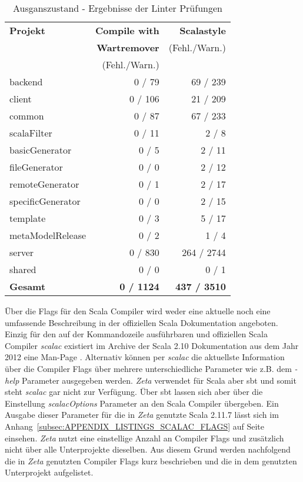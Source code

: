 \begin{table}[ht]
    \smallskip
    \centering
    \begin{tabular}{| l | r | r |}
    \hline
    \bf Projekt & \bf Compile with & \bf Scalastyle \\ 
    ~ & \bf Wartremover & (Fehl./Warn.) \\ 
    ~ & (Fehl./Warn.) & ~ \\ \hline
    backend & 0 / 79 & 69 / 239 \\ \hline
    client & 0 / 106 & 21 / 209  \\ \hline
    common & 0 / 87 & 67 / 233 \\ \hline
    scalaFilter & 0 / 11 & 2 / 8 \\ \hline
    basicGenerator & 0 / 5 & 2 / 11  \\ \hline
    fileGenerator & 0 / 0 & 2 / 12  \\ \hline
    remoteGenerator & 0 / 1 & 2 / 17 \\ \hline
    specificGenerator & 0 / 0 & 2 / 15 \\ \hline
    template & 0 / 3 & 5 / 17 \\ \hline
    metaModelRelease & 0 / 2 & 1 / 4 \\ \hline
    server & 0 / 830 & 264 / 2744 \\ \hline
    shared & 0 / 0 & 0 / 1\\ \hline
    \bf Gesamt & \bf 0 / 1124 & \bf 437 / 3510 \\ \hline
    \end{tabular}
    \caption{Ausganszustand - Ergebnisse der Linter Prüfungen \cite[Scalastyle]{analys_old}}
    \label{tab:ZETA_METRICS_LINT_OLD}
\end{table}

Über die Flags für den Scala Compiler wird weder eine aktuelle noch eine umfassende Beschreibung in der offiziellen Scala Dokumentation angeboten. Einzig für den auf der Kommandozeile ausführbaren und offiziellen Scala Compiler \textit{scalac} existiert im Archive der Scala 2.10 Dokumentation aus dem Jahr 2012 eine Man-Page \cite{scalac_man_page}. Alternativ können per \textit{scalac} die aktuellste Information über die Compiler Flags über mehrere unterschiedliche Parameter wie z.B. dem \textit{-help} Parameter ausgegeben werden. \textit{Zeta} verwendet für Scala aber \ac{sbt} und somit steht \textit{scalac} gar nicht zur Verfügung. Über \ac{sbt} lassen sich aber über die Einstellung \textit{scalacOptions} Parameter an den Scala Compiler übergeben. Ein Ausgabe dieser Parameter für die in \textit{Zeta} genutzte Scala 2.11.7 lässt sich im Anhang~\ref{subsec:APPENDIX_LISTINGS_SCALAC_FLAGS} auf Seite~\pageref{subsec:APPENDIX_LISTINGS_SCALAC_FLAGS} einsehen. \textit{Zeta} nutzt eine einstellige Anzahl an Compiler Flags und zusätzlich nicht über alle Unterprojekte dieselben. Aus diesem Grund werden nachfolgend die in \textit{Zeta} genutzten Compiler Flags kurz beschrieben und die in dem genutzten Unterprojekt aufgelistet.

